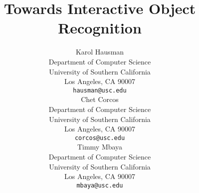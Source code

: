 \title{Towards Interactive Object Recognition}

\author{
Karol Hausman \\
Department of Computer Science\\
University of Southern California\\
Los Angeles, CA 90007 \\
\texttt{hausman@usc.edu} \\
\And
Chet Corcos \\
Department of Computer Science\\
University of Southern California\\
Los Angeles, CA 90007 \\
\texttt{corcos@usc.edu} \\
\And
Timmy Mbaya \\
Department of Computer Science\\
University of Southern California\\
Los Angeles, CA 90007 \\
\texttt{mbaya@usc.edu} \\
}
